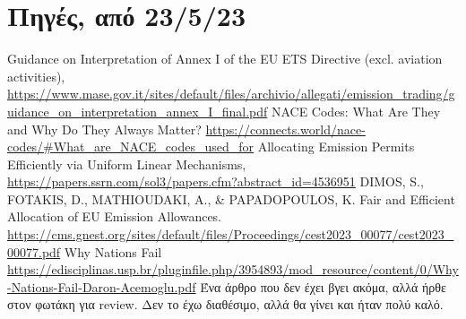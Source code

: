 \documentclass[a4paper,twoside,10pt]{article}
\begin{document}
\section*{Πηγές, από 23/5/23}
\begin{thebibliography}{999}
	
	Guidance on Interpretation of Annex I of the EU ETS Directive (excl. aviation activities),
	\url{https://www.mase.gov.it/sites/default/files/archivio/allegati/emission_trading/guidance_on_interpretation_annex_I_final.pdf}
	NACE Codes: What Are They and Why Do They Always Matter?
	\url{https://connects.world/nace-codes/#What_are_NACE_codes_used_for}
	Allocating Emission Permits Efficiently via Uniform Linear Mechanisms, \url{https://papers.ssrn.com/sol3/papers.cfm?abstract_id=4536951}
	DIMOS, S., FOTAKIS, D., MATHIOUDAKI, A., \& PAPADOPOULOS, K. Fair and Efficient Allocation of EU Emission Allowances. \url{https://cms.gnest.org/sites/default/files/Proceedings/cest2023_00077/cest2023_00077.pdf}
	Why Nations Fail
	\url{https://edisciplinas.usp.br/pluginfile.php/3954893/mod_resource/content/0/Why-Nations-Fail-Daron-Acemoglu.pdf}
	Ένα άρθρο που δεν έχει βγει ακόμα, αλλά ήρθε στον φωτάκη για review. Δεν το έχω διαθέσιμο, αλλά θα γίνει και ήταν πολύ καλό.
	

		
		
	
\end{thebibliography}
\end{document}
